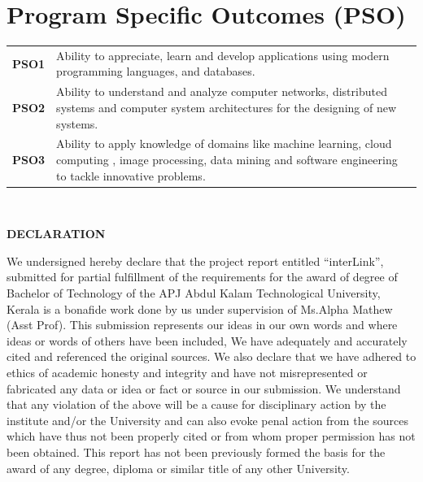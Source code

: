 \documentclass[twoside,a4paper,openright]{report} %
\begin{document}
	
	
	\thispagestyle{empty}
	
		\newpage
			\vspace*{6cm}
	\section*{\centering \large Program Specific Outcomes (PSO)}
	\begin{table}[ht]
		\centering
		\begin{tabular}{p{2cm} p{12cm}}
			\textbf {PSO1}\; &Ability to appreciate, learn and develop applications using modern programming languages, and databases. \\
			\textbf {PSO2}\; & Ability to understand and analyze computer networks, distributed systems and computer system architectures for the designing of new systems.  \\
			\textbf {PSO3}\; & Ability to apply knowledge of domains like machine learning, cloud computing , image processing, data mining and software engineering to tackle innovative problems.  \\
		\end{tabular}
		\label{tab:my_label}
	\end{table}
	
	
	
	
	
	
	\thispagestyle{empty}
	
	\mbox{~}
		\newpage
	\vspace*{2.5 cm}
	\begin{center}
		\textbf{DECLARATION}\\
	\end{center}
	We undersigned hereby declare that the project report entitled “interLink”, submitted for partial fulfillment of the requirements for the award of degree of Bachelor of Technology of the APJ Abdul Kalam Technological University, Kerala is a bonafide work done by us
	under supervision of Ms.Alpha Mathew (Asst Prof). This submission represents our ideas in our own words and where ideas or words of others have been included, We have adequately and accurately cited and referenced the original sources. We also declare that we have
	adhered to ethics of academic honesty and integrity and have not misrepresented or fabricated any data or idea or fact or source in our submission. We understand that any violation of the above will be a cause for disciplinary action by the institute and/or the
	University and can also evoke penal action from the sources which have thus not been properly cited or from whom proper permission has not been obtained. This report has not been previously formed the basis for the award of any degree, diploma or similar title of any other University.
	
\end{document}
